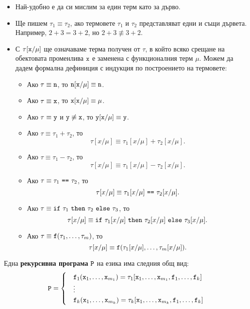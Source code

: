 \begin{itemize}
\item
  Най-удобно е да си мислим за един терм като за дърво.
\item
  Ще пишем $\tau_1 \equiv \tau_2$, ако термовете $\tau_1$ и $\tau_2$ представляват едни и същи дървета.
  Например, $2+3 = 3+2$, но $2+3 \not\equiv 3+2$. 
\item
  С $\tau[\texttt{x}/{\mu}]$ ще означаваме терма получен от $\tau$, в който всяко срещане на обектовата променлива $\texttt{x}$
  е заменена с функционалния терм $\mu$. Можем да дадем формална дефиниция с индукция по построението на термовете:
  \begin{itemize}
  \item
    Ако $\tau \equiv \texttt{n}$, то $\texttt{n}[\texttt{x}/\mu] \equiv \texttt{n}$.
  \item
    Ако $\tau \equiv \texttt{x}$, то $\texttt{x}[\texttt{x}/\mu] \equiv \mu$.
  \item
    Ако $\tau \equiv \texttt{y}$ и $\texttt{y} \not\equiv \texttt{x}$, то $\texttt{y}[\texttt{x}/\mu] \equiv \texttt{y}$.
  \item
    Ако $\tau \equiv \tau_1 + \tau_2$, то
    \[\tau[x/\mu] \equiv \tau_1[x/\mu] + \tau_2[x/\mu].\]
  \item
    Ако $\tau \equiv \tau_1 - \tau_2$, то
    \[\tau[x/\mu] \equiv \tau_1[x/\mu] - \tau_2[x/\mu].\]
  \item
    Ако $\tau \equiv \tau_1\ \vv{==}\ \tau_2$, то
    \[\tau[x/\mu] \equiv \tau_1[x/\mu]\ \texttt{==}\ \tau_2[x/\mu].\]
  \item
    Ако $\tau \equiv \texttt{if}\ \tau_1\ \texttt{then}\ \tau_2\ \texttt{else}\ \tau_3$, то
    \[\tau[x/\mu] \equiv \texttt{if}\ \tau_1[x/\mu]\ \texttt{then}\ \tau_2[x/\mu]\ \texttt{else}\ \tau_3[x/\mu].\]
  \item
    Ако $\tau \equiv \texttt{f}(\tau_1,\dots,\tau_m)$, то
    \[\tau[x/\mu] \equiv \texttt{f}(\tau_1[x/\mu], \dots, \tau_m[x/\mu]).\]
  \end{itemize}  
\end{itemize}


Една {\bf рекурсивна програма} $\texttt{P}$ на езика \FUN има следния общ вид:
\begin{align*}
  \texttt{P} = 
  \begin{cases}
    & \texttt{f}_1(\texttt{x}_1,\dots,\texttt{x}_{m_1}) = \tau_1[\texttt{x}_1,\dots,\texttt{x}_{m_1},\texttt{f}_1,\dots,\texttt{f}_k]\\
    & \vdots\\
    & \texttt{f}_k(\texttt{x}_1,\dots,\texttt{x}_{m_k}) = \tau_k[\texttt{x}_1,\dots,\texttt{x}_{m_k},\texttt{f}_1,\dots,\texttt{f}_k]
  \end{cases}
\end{align*}

